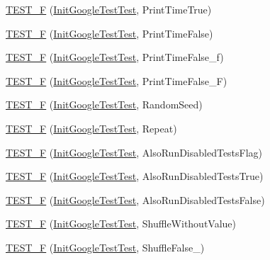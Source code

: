 \begin{DoxyCompactItemize}
\item 
\hyperlink{namespacetesting_ae0f76bbca8e2bf7d9de60c4b8b0dfa16}{T\+E\+S\+T\+\_\+F} (\hyperlink{classtesting_1_1_init_google_test_test}{Init\+Google\+Test\+Test}, Print\+Time\+True)
\item 
\hyperlink{namespacetesting_a1ec71efef2639ccb137ac5b7ccd8c9d1}{T\+E\+S\+T\+\_\+F} (\hyperlink{classtesting_1_1_init_google_test_test}{Init\+Google\+Test\+Test}, Print\+Time\+False)
\item 
\hyperlink{namespacetesting_af87ac7e6dc7c0ea1d85eaa3a57358d29}{T\+E\+S\+T\+\_\+F} (\hyperlink{classtesting_1_1_init_google_test_test}{Init\+Google\+Test\+Test}, Print\+Time\+False\+\_\+f)
\item 
\hyperlink{namespacetesting_a337ddb6629adb42219e612b67d18c6f1}{T\+E\+S\+T\+\_\+F} (\hyperlink{classtesting_1_1_init_google_test_test}{Init\+Google\+Test\+Test}, Print\+Time\+False\+\_\+F)
\item 
\hyperlink{namespacetesting_a2a1e31fea507bdd6e011450e2f316bcf}{T\+E\+S\+T\+\_\+F} (\hyperlink{classtesting_1_1_init_google_test_test}{Init\+Google\+Test\+Test}, Random\+Seed)
\item 
\hyperlink{namespacetesting_a254368f412c980556143a9182f451981}{T\+E\+S\+T\+\_\+F} (\hyperlink{classtesting_1_1_init_google_test_test}{Init\+Google\+Test\+Test}, Repeat)
\item 
\hyperlink{namespacetesting_ab6624d856abda0913f536a4e719dd769}{T\+E\+S\+T\+\_\+F} (\hyperlink{classtesting_1_1_init_google_test_test}{Init\+Google\+Test\+Test}, Also\+Run\+Disabled\+Tests\+Flag)
\item 
\hyperlink{namespacetesting_a3e73dbd19fb50e5ad516de9592963033}{T\+E\+S\+T\+\_\+F} (\hyperlink{classtesting_1_1_init_google_test_test}{Init\+Google\+Test\+Test}, Also\+Run\+Disabled\+Tests\+True)
\item 
\hyperlink{namespacetesting_a1c50ef2a972315130f1613c69204e259}{T\+E\+S\+T\+\_\+F} (\hyperlink{classtesting_1_1_init_google_test_test}{Init\+Google\+Test\+Test}, Also\+Run\+Disabled\+Tests\+False)
\item 
\hyperlink{namespacetesting_a2f1fd86207e6c7085455dc2d582d1d12}{T\+E\+S\+T\+\_\+F} (\hyperlink{classtesting_1_1_init_google_test_test}{Init\+Google\+Test\+Test}, Shuffle\+Without\+Value)
\item 
\hyperlink{namespacetesting_a1acc3dcde65e75293451073528cb1c5a}{T\+E\+S\+T\+\_\+F} (\hyperlink{classtesting_1_1_init_google_test_test}{Init\+Google\+Test\+Test}, Shuffle\+False\+\_)
\item 

\end{DoxyCompactItemize}
